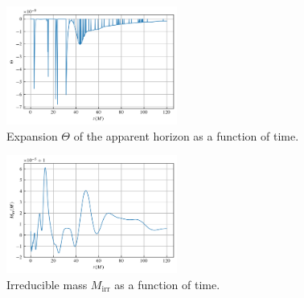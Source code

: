 \documentclass[%
 reprint,
 amsmath,amssymb,
 aps,
 prd,
]{revtex4-2}
\begin{document}
\begin{figure}[h]
	\includegraphics[width=0.5\textwidth]{data/expansion.png}%
	\caption{\label{fig:expansion} Expansion $\Theta$ of the apparent horizon as a function of time.}
\end{figure}

\begin{figure}[h]
	\includegraphics[width=0.5\textwidth]{data/m_irr.png}%
	\caption{\label{fig:m_irr} Irreducible mass $M_\mathrm{irr}$ as a function of time.}
\end{figure}



\end{document}
